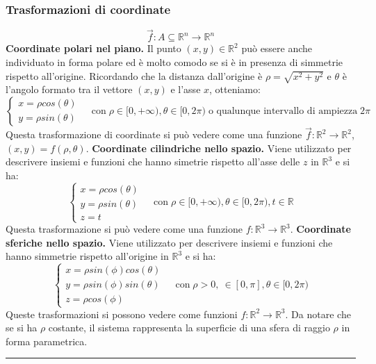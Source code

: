 \subsubsection{Trasformazioni di coordinate}
\[
    \vec{f}: A\subseteq \mathbb{R}^n \rightarrow  \mathbb{R}^n
\]
\textbf{Coordinate polari nel piano.} Il punto $(x,y) \in \mathbb{R}^2$ può essere anche individuato in forma polare ed è molto comodo se si è in presenza di simmetrie rispetto all'origine. Ricordando che la distanza dall'origine è $\rho = \sqrt{x^2+ y^2}$ e $\theta$ è l'angolo formato tra il vettore $(x,y)$ e l'asse $x$, otteniamo:
\[
    \begin{cases}
        x = \rho cos(\theta)\\
        y = \rho sin(\theta)
    \end{cases} \;\;\;\;\text{con} \; \rho \in[0,+\infty), \theta \in [0,2\pi) \;\text{o qualunque intervallo di ampiezza} \; 2\pi
\]
Questa trasformazione di coordinate si può vedere come una funzione $\vec{f}: \mathbb{R}^2 \rightarrow \mathbb{R}^2$, $(x,y) = f(\rho, \theta)$.\newline
\newline
\textbf{Coordinate cilindriche nello spazio.} Viene utilizzato per descrivere insiemi e funzioni che hanno simetrie rispetto all'asse delle $z$ in $\mathbb{R}^3$ e si ha:
\[
    \begin{cases}
        x = \rho cos(\theta)\\
        y = \rho sin(\theta)\\
        z = t
    \end{cases} \;\;\;\;\text{con}\; \rho \in [0, +\infty), \theta \in [0, 2\pi), t \in \mathbb{R}
\]
Questa trasformazione si può vedere come una funzione $f: \mathbb{R}^3 \rightarrow \mathbb{R}^3$.\newline
\newline
\textbf{Coordinate sferiche nello spazio.} Viene utilizzato per descrivere insiemi e funzioni che hanno simmetrie rispetto all'origine in $\mathbb{R}^3$ e si ha:
\[
    \begin{cases}
        x = \rho sin(\phi)cos(\theta)\\
        y =\rho sin(\phi)sin(\theta)\\
        z = \rho cos(\phi)
    \end{cases} \;\;\;\;\text{con}\; \rho > 0, \ \in[0,\pi], \theta \in[0,2\pi)
\]
Queste trasformazioni si possono vedere come funzioni $f: \mathbb{R}^2 \rightarrow \mathbb{R}^3$. \newline
Da notare che se si ha $\rho$ costante, il sistema rappresenta la superficie di una sfera di raggio $\rho$ in forma parametrica.\newline
\rule{\textwidth}{0,4pt}
